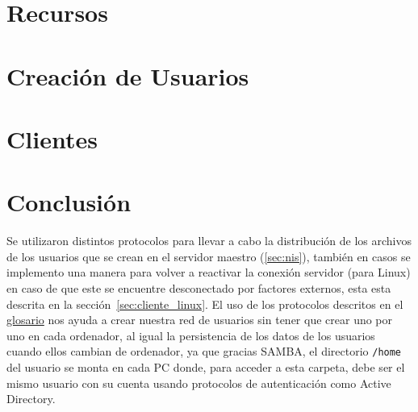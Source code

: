 \documentclass[journal]{IEEEtran}
\begin{document}
\cleardoublepage{}

\section{Recursos}\label{sec:recursos}



\cleardoublepage{}

\section{Creación de Usuarios}\label{sec:cusuarios}



\cleardoublepage{}

\section{Clientes}\label{sec:clientes}


\newpage{}
\section{Conclusión}\label{sec:conclusion}
Se utilizaron distintos protocolos para llevar a cabo la distribución
de los archivos de los usuarios que se crean en el servidor
maestro (\ref{sec:nis}), también en casos se implemento una manera para
volver a reactivar la conexión servidor (para Linux) en caso de
que este se encuentre
desconectado por factores externos, esta esta descrita en la
sección~\ref{sec:cliente_linux}.
El uso de los protocolos descritos en el \hyperref[glo:glosario]{glosario}
nos ayuda a crear nuestra red de usuarios sin tener que crear uno por uno
en cada ordenador, al igual la persistencia de los datos de los usuarios cuando
ellos cambian de ordenador, ya que gracias \Gls{SAMBA}, el directorio
\texttt{/home} del usuario se monta en cada PC donde, para acceder a esta
carpeta, debe ser el mismo usuario con su cuenta usando protocolos de
autenticación como Active Directory.


\vfill{}

\listoffigures
{}
\listoflistings{}
\printglossary{}\label{glo:glosario}
\printglossary[type=\acronymtype]
\end{document}
